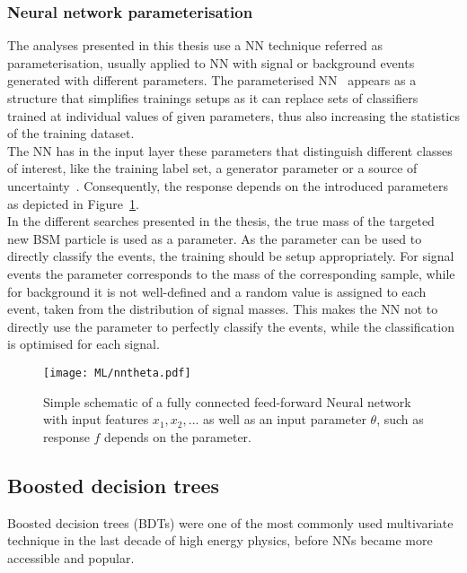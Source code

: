 \subsubsection{Neural network parameterisation}

The analyses presented in this thesis use a NN technique referred as parameterisation, usually applied to NN with signal or background events generated with different parameters. The parameterised NN~\cite{Baldi_2016} appears as a structure that simplifies trainings setups as it can replace sets of classifiers trained at individual values of given parameters, thus also increasing the statistics of the training dataset.\\

The NN has in the input layer these parameters that distinguish different classes of interest, like the training label set, a generator parameter or a source of uncertainty~\cite{Ghosh_2021}. Consequently, the response depends on the introduced parameters as depicted in Figure~\ref{ML:PNN}.\\

In the different searches presented in the thesis, the true mass of the targeted new BSM particle is used as a parameter. As the parameter can be used to directly classify the events, the training should be setup appropriately. For signal events the parameter corresponds to the mass of the corresponding sample, while for background it is not well-defined and a random value is assigned to each event, taken from the distribution of signal masses. This makes the NN not to directly use the parameter to perfectly classify the events, while the classification is optimised for each signal.

\begin{figure}[htbp]
    \RawFloats
    \begin{center}
    \texttt{[image: ML/nntheta.pdf]}
    \caption{
        Simple schematic of a fully connected feed-forward Neural network with input features $x_1, x_2,...$ as well as an input parameter $\theta$, such as response $f$ depends on the parameter.
    }
    \label{ML:PNN}
    \end{center}
\end{figure}

\subsection{Boosted decision trees}

Boosted decision trees (BDTs) were one of the most commonly used multivariate technique in the last decade of high energy physics, before NNs became more accessible and popular. \\

